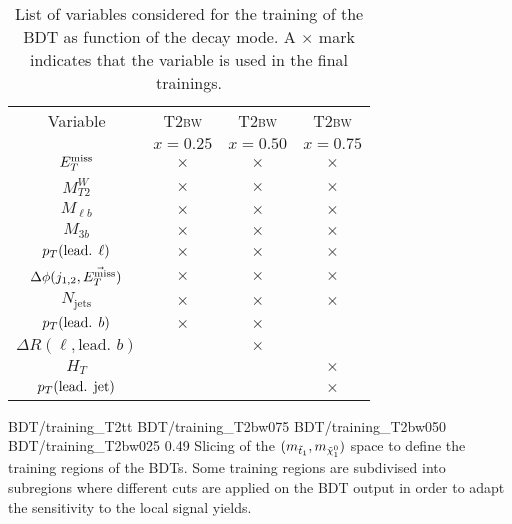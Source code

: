 \begin{table}[h!]
\begin{center}
\begin{tabular}{|c|ccc|}
                    \hline
                    Variable                            & \textsc{T2bw}  & \textsc{T2bw}  & \textsc{T2bw}      \\
                                                        & $x=0.25$       & $x=0.50$       & $x=0.75$  \\
                    \hline
                    $E_T^\text{miss}$                              & $\times$       & $\times$       & $\times$  \\
                    $M_{T2}^W$                          & $\times$       & $\times$       & $\times$  \\
                    $M_{\ell b}$                        & $\times$       & $\times$       & $\times$  \\
                    $M_{3 b}$                           & $\times$       & $\times$       & $\times$  \\
                    $p_T(\text{lead. } \ell)$           & $\times$       & $\times$       & $\times$  \\
                    $\Delta\phi(j_{1,2},\vec{E_T^\text{miss}})$    & $\times$       & $\times$       & $\times$  \\
                    $N_\text{jets}$                     & $\times$       & $\times$       & $\times$  \\
                    $p_T(\text{lead. } b)$              & $\times$       & $\times$       &           \\
                    $\Delta R( \ell, \text{lead. } b)$  &                & $\times$       &           \\
                    $H_{T}$                             &                &                & $\times$  \\
                    $p_T(\text{lead. jet})$             &                &                & $\times$  \\
                    \hline
                \end{tabular}
                \caption{List of variables considered for the training of the BDT
                as function of the decay mode. A $\times$ mark indicates that the variable
                is used in the final trainings.}
                \label{tab:BDTVariableUsage}
            \end{center}
        \end{table}

                              {BDT/training_T2tt}
                              {BDT/training_T2bw075}
                              {BDT/training_T2bw050}
                              {BDT/training_T2bw025}
                              {0.49}
                              {Slicing of the $(m_{\tilde{t}_1},m_{\tilde{\chi}_1^0})$ space
                              to define the training regions of the BDTs. Some training
                              regions are subdivised into subregions where different cuts
                              are applied on the BDT output in order to adapt the sensitivity
                              to the local signal yields.}

